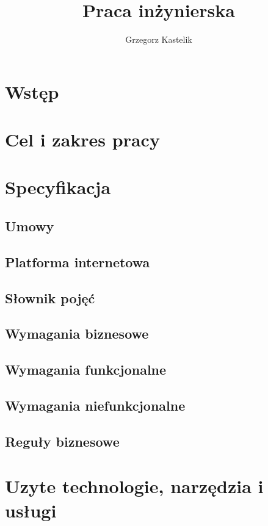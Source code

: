 \documentclass[12pt]{report}
\author{Grzegorz Kastelik}
\title{Praca inżynierska}
\begin{document}
    
    \tableofcontents
    \chapter*{Wstęp}
        
    \chapter*{Cel i zakres pracy}
        
    \chapter{Specyfikacja}
        \section{Umowy}
            
        \section{Platforma internetowa}
            
        \section{Słownik pojęć}
            
        \section{Wymagania biznesowe}
            
        \section{Wymagania funkcjonalne}
            
        \section{Wymagania niefunkcjonalne}
            
        \section{Reguły biznesowe}
            
    \chapter{Uzyte technologie, narzędzia i usługi}
        
\end{document}
